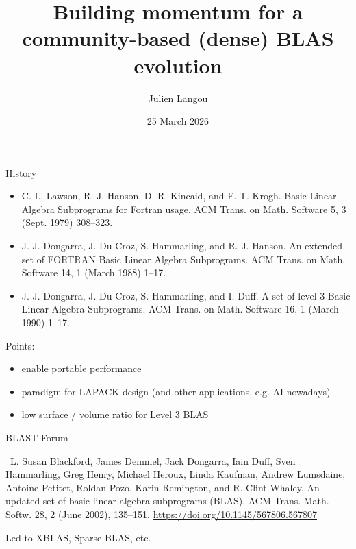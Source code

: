 \documentclass[aspectratio=169]{beamer}
\title{Building momentum for a community-based (dense) BLAS evolution}
\author{Julien Langou}
\date{25 March 2026}
\begin{document}
\begin{frame}
\titlepage
\end{frame}
\begin{frame}{History}

\begin{itemize}
\item[\pgfuseimage{beamericonarticle}]
C. L. Lawson, R. J. Hanson, D. R. Kincaid, and F. T. Krogh.
Basic Linear Algebra Subprograms for Fortran usage.
ACM Trans. on Math. Software 5, 3 (Sept. 1979) 308–323.
\item[\pgfuseimage{beamericonarticle}]
J. J. Dongarra, J. Du Croz, S. Hammarling, and R. J. Hanson.
An extended set of FORTRAN Basic Linear Algebra Subprograms.
ACM Trans. on Math. Software 14, 1 (March 1988) 1–17.
\item[\pgfuseimage{beamericonarticle}]
J. J. Dongarra, J. Du Croz, S. Hammarling, and I. Duff.
A set of level 3 Basic Linear Algebra Subprograms.
ACM Trans. on Math. Software 16, 1 (March 1990) 1–17.
\end{itemize}

Points:
\begin{itemize}
\item enable portable performance
\item paradigm for LAPACK design (and other applications, e.g. AI nowadays)
\item low surface / volume ratio for Level 3 BLAS
\end{itemize}

\end{frame}

\begin{frame}{BLAST Forum}

~L. Susan Blackford, James Demmel, Jack Dongarra, Iain Duff, Sven Hammarling, Greg Henry, Michael Heroux, Linda Kaufman, Andrew Lumsdaine, Antoine Petitet, Roldan Pozo, Karin Remington, and R. Clint Whaley.
An updated set of basic linear algebra subprograms (BLAS). ACM Trans. Math. Softw. 28, 2 (June 2002), 135–151. 
\url{https://doi.org/10.1145/567806.567807}



Led to XBLAS, Sparse BLAS, etc.

\end{frame}
\end{document}
